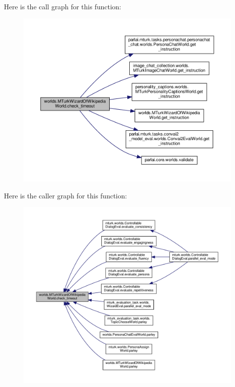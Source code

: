 Here is the call graph for this function\+:
\nopagebreak
\begin{figure}[H]
\begin{center}
\leavevmode
\includegraphics[width=350pt]{classworlds_1_1MTurkWizardOfWikipediaWorld_a79a5b5c3295a41bf9f35b6fa3e8b0d85_cgraph}
\end{center}
\end{figure}
Here is the caller graph for this function\+:
\nopagebreak
\begin{figure}[H]
\begin{center}
\leavevmode
\includegraphics[width=350pt]{classworlds_1_1MTurkWizardOfWikipediaWorld_a79a5b5c3295a41bf9f35b6fa3e8b0d85_icgraph}
\end{center}
\end{figure}
\mbox{\label{classworlds_1_1MTurkWizardOfWikipediaWorld_acf9de6ee85091278282c7c4028b75acf}} 
